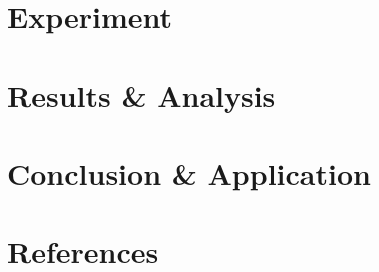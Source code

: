 \documentclass{article}
\begin{document}
\section{Experiment}

\section{Results \& Analysis}

\section{Conclusion \& Application}

\section{References}



\section{}

\end{document}
